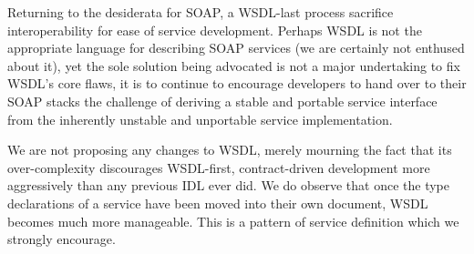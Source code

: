 Returning to the desiderata for SOAP, a WSDL-last process sacrifice
interoperability for ease of service development. Perhaps WSDL is not
the appropriate language for describing SOAP services (we are
certainly not enthused about it), yet the sole solution being
advocated is not a major undertaking to fix WSDL's core flaws, it is
to continue to encourage developers to hand over to their SOAP stacks
the challenge of deriving a stable and portable service interface from
the inherently unstable and unportable service implementation.

We are not proposing any changes to WSDL, merely mourning the fact
that its over-complexity discourages WSDL-first, contract-driven
development more aggressively than any previous IDL ever did. We do
observe that once the type declarations of a service have been moved
into their own document, WSDL becomes much more manageable. This is a
pattern of service definition which we strongly encourage.
